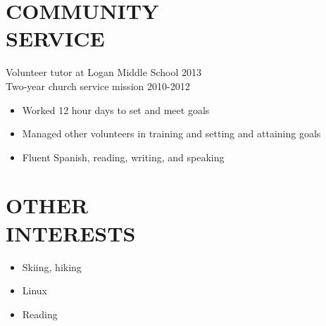 \documentclass[line,margin]{res}
\begin{document}
\begin{resume}
	\section{COMMUNITY \\ SERVICE}

	Volunteer tutor at Logan Middle School \hfill 2013
	\\Two-year church service mission \hfill 2010-2012
	\begin{itemize} \itemsep -2pt %
		\item Worked 12 hour days to set and meet goals
		\item Managed other volunteers in training and setting and attaining goals
		\item Fluent Spanish, reading, writing, and speaking
	\end{itemize}

	\section{OTHER \\ INTERESTS}

	\begin{itemize}
		\item Skiing, hiking
		\item Linux
		\item Reading
	\end{itemize}



\end{resume}
\end{document}
